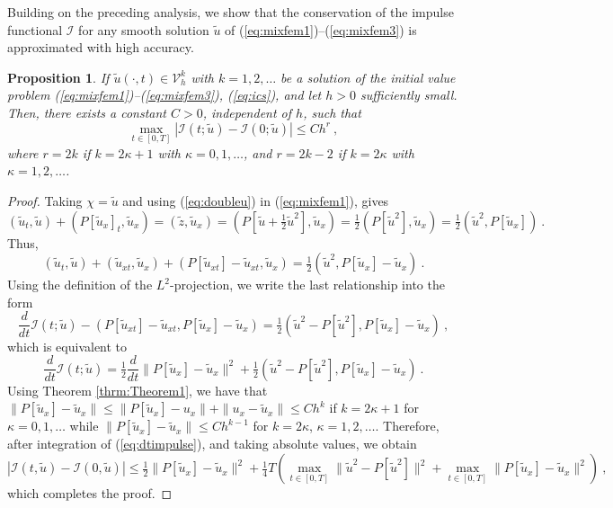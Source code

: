 \documentclass{amsart}
\newtheorem{proposition}{Proposition}[section]
\begin{document}
Building on the preceding analysis, we show that the conservation of the impulse functional $\mathcal{I}$ for any smooth solution $\tilde{u}$ of (\ref{eq:mixfem1})--(\ref{eq:mixfem3}) is approximated with high accuracy.
%
\begin{proposition}\label{prop:impulsec}
If $\tilde{u}(\cdot,t)\in \mathcal{V}_h^k$ with $k=1,2,\dots$ be a solution of the initial value problem (\ref{eq:mixfem1})--(\ref{eq:mixfem3}), (\ref{eq:ics}), and let $h>0$ sufficiently small. Then, there exists a constant $C>0$, independent of $h$, such that
\begin{equation}\label{eq:approxprop}
\max_{t\in[0,T]}|\mathcal{I}(t;\tilde{u})-\mathcal{I}(0;\tilde{u})|\leq Ch^r\ ,
\end{equation}
where $r=2k$ if $k=2\kappa+1$ with $\kappa=0,1,\dots$, and $r=2k-2$ if $k=2\kappa$ with $\kappa=1,2,\dots$.
\end{proposition}
%
\begin{proof} 
%
Taking $\chi=\tilde{u}$ and using (\ref{eq:doubleu}) in (\ref{eq:mixfem1}), gives
\begin{equation} \label{eq:almost1}
(\tilde{u}_t,\tilde{u})+({P[\tilde{u}_x]}_t,\tilde{u}_x)=(\tilde{z},\tilde{u}_x)=(P[\tilde{u}+\tfrac{1}{2}\tilde{u}^2],\tilde{u}_x)=\tfrac{1}{2}(P[\tilde{u}^2],\tilde{u}_x)=\tfrac{1}{2}(\tilde{u}^2,P[\tilde{u}_x])\ .
\end{equation}
%
Thus,
$$
(\tilde{u}_t,\tilde{u})+(\tilde{u}_{xt},\tilde{u}_x)+(P[\tilde{u}_{xt}]-\tilde{u}_{xt},\tilde{u}_x)=\tfrac{1}{2}(\tilde{u}^2,P[\tilde{u}_x]-\tilde{u}_x)\ .$$
Using the definition of the $L^2$-projection, we write the last relationship into the form 
$$\frac{d}{dt}\mathcal{I}(t;\tilde{u})-(P[\tilde{u}_{xt}]-\tilde{u}_{xt},P[\tilde{u}_x]-\tilde{u}_x)=\tfrac{1}{2}(\tilde{u}^2-P[\tilde{u}^2],P[\tilde{u}_x]-\tilde{u}_x)\ ,$$
which is equivalent to
\begin{equation}\label{eq:dtimpulse}
\frac{d}{dt}\mathcal{I}(t;\tilde{u})=\tfrac{1}{2}\frac{d}{dt}\|P[\tilde{u}_x]-\tilde{u}_x\|^2+\tfrac{1}{2}(\tilde{u}^2-P[\tilde{u}^2],P[\tilde{u}_x]-\tilde{u}_x)\ .
\end{equation}
Using Theorem \ref{thrm:Theorem1}, we have that $\|P[\tilde{u}_x]-\tilde{u}_x\|\leq \|P[\tilde{u}_x]-u_x\|+\|u_x-\tilde{u}_x\|\leq Ch^k$ if $k=2\kappa+1$ for $\kappa=0,1,\dots$ while $\|P[\tilde{u}_x]-\tilde{u}_x\|\leq Ch^{k-1}$ for $k=2\kappa$, $\kappa=1,2,\dots$. Therefore, after integration of (\ref{eq:dtimpulse}), and taking absolute values, we obtain
$$|\mathcal{I}(t,\tilde{u})-\mathcal{I}(0,\tilde{u})|\leq \tfrac{1}{2}\|P[\tilde{u}_x]-\tilde{u}_x\|^2+\tfrac{1}{4}T(\max_{t\in[0,T]}\|\tilde{u}^2-P[\tilde{u}^2]\|^2+\max_{t\in[0,T]}\|P[\tilde{u}_x]-\tilde{u}_x\|^2)\ ,$$
which completes the proof.
%
\end{proof}
\end{document}
